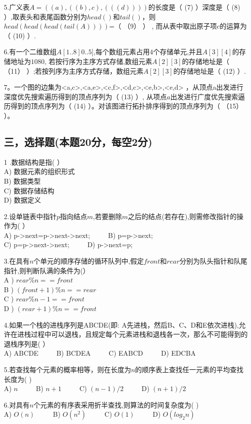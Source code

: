 5.广义表$A=((a),((b),c),(((d))))$的长度是（ (7) ）深度是（ (8) ）,取表头和表尾函数分别为$head()$和$tail()$，则$head(head(head(tail(A))))$=（ （9） ） , 而从表中取出原子项$c$的运算为（ (10)  ）.

6.有一个二维数组$A[1..8]0..5]$,每个数组元素占用$4$个存储单元,并且$A[3][4]$的存储地址为$1080$, 若按行序为主序方式存储,数组元素$A[2][3]$的存储地址是（ （11） ）;若按列序为主序方式存储，数组元素$A[2][3]$的存储地址是（ (12) ）.

7。一个图的边集为{<a,c>,<a,e>,<c,f>,<d,c>,<e,b>,<e,d>} ，从顶点a出发进行深度优先搜索遍历得到的顶点序列为（ (13) ）, 从项点$a$出发进行广度优先搜索逼历得到的顶点序列为（ (14) ）。对该图进行拓扑排序得到的顶点序列为（ （15） ）。

\subsection{三，选择题(本题20分，每空2分)}
1 .数据结构是指(  ） \\
A) 数据元素的组织形式 \\
B) 数据类型 \\
C) 数据存储结构 \\
D) 数据定义

2.设单链表中指针$p$指向结点$m$,若要删除$m$之后的结点(若存在),则需修改指针的操作为(  ） \\
A) p->next=p->next->next; $\qquad$ B) p=p->next; \\
C) p=p->next->next; $\qquad$ D) p->next=p;

3.在具有$n$个单元的顺序存储的循环队列中,假定$front$和$rear$分别为队头指针和队尾指针,则判断队满的条件为(） \\
A ) $rear\%n==front$ \\
B ) $(front+1)\%n==rear$ \\
C ) $rear\%n-1==front$ \\
D ) $(rear+1)\%n==front$

4.如果一个栈的进栈序列是ABCDE(即: A先进栈，然后B、C、D和E依次进栈),允许在进栈过程中可以退栈，且规定每个元素进栈和退栈各一次，那么不可能得到的退栈序列是(  ） \\
A) ABCDE $\qquad$ B) BCDEA $\qquad$ C) EABCD $\qquad$ D) EDCBA

5.若查找每个元素的概率相等，则在长度为$n$的顺序表上查找任一元素的平均查找长度为(  ) \\
A) $n$ $\qquad$ B) $n+1$ $\qquad$ C) $(n-1)/2$ $\qquad$ D) $(n+1)/2$

6.对具有$n$个元素的有序表采用折半查找,则算法的时间复杂度为(  ) \\
A) $O(n)$ $\qquad$ B) $O(n^2)$ $\qquad$ C) $O(1)$ $\qquad$ D) $O(log_2n)$

